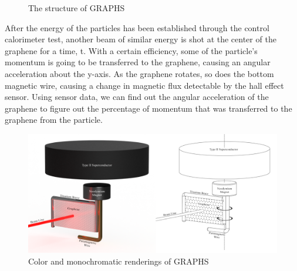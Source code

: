 \documentclass{article}
\begin{document}
\begin{figure}[H]
    \caption{The structure of GRAPHS}
    \end{figure}

After the energy of the particles has been established through the control calorimeter test, another beam of similar energy is shot at the center of the graphene for a time, t. With a certain efficiency, some of the particle's momentum is going to be transferred to the graphene, causing an angular acceleration about the y-axis. As the graphene rotates, so does the bottom magnetic wire, causing a change in magnetic flux detectable by the hall effect sensor. Using sensor data, we can find out the angular acceleration of the graphene to figure out the percentage of momentum that was transferred to the graphene from the particle.

    \begin{figure}[H]
    \includegraphics[scale=0.17]{color_monochrome_diagram.png}
    \caption{Color and monochromatic renderings of GRAPHS}
    \end{figure}
\end{document}
